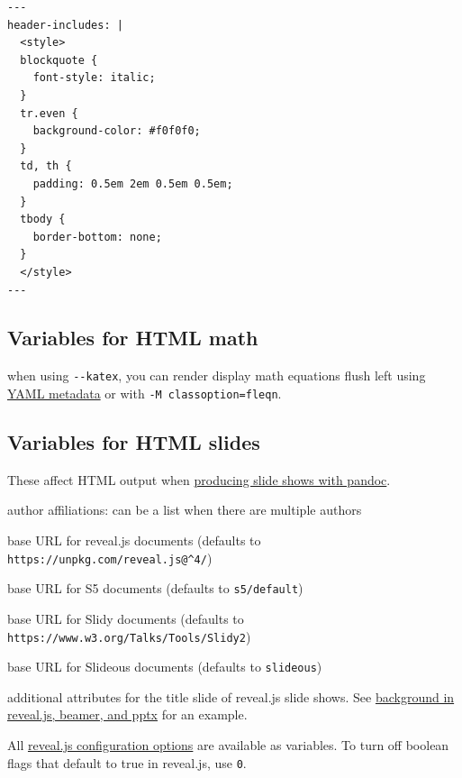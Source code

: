 \documentclass[
  b5paper
]{book}
\providecommand{\tightlist}{%
  \setlength{\itemsep}{0pt}\setlength{\parskip}{0pt}}
\begin{document}
\begin{verbatim}
---
header-includes: |
  <style>
  blockquote {
    font-style: italic;
  }
  tr.even {
    background-color: #f0f0f0;
  }
  td, th {
    padding: 0.5em 2em 0.5em 0.5em;
  }
  tbody {
    border-bottom: none;
  }
  </style>
---
\end{verbatim}

\subsection{Variables for HTML math}\label{variables-for-html-math}

\begin{description}
\tightlist
\item[\texttt{classoption}]
when using \texttt{-\/-katex}, you can render display math equations
flush left using \hyperref[layout]{YAML metadata} or with
\texttt{-M\ classoption=fleqn}.
\end{description}

\subsection{Variables for HTML slides}\label{variables-for-html-slides}

These affect HTML output when \hyperref[slide-shows]{producing slide
shows with pandoc}.

\begin{description}
\tightlist
\item[\texttt{institute}]
author affiliations: can be a list when there are multiple authors
\item[\texttt{revealjs-url}]
base URL for reveal.js documents (defaults to
\texttt{https://unpkg.com/reveal.js@\^{}4/})
\item[\texttt{s5-url}]
base URL for S5 documents (defaults to \texttt{s5/default})
\item[\texttt{slidy-url}]
base URL for Slidy documents (defaults to
\texttt{https://www.w3.org/Talks/Tools/Slidy2})
\item[\texttt{slideous-url}]
base URL for Slideous documents (defaults to \texttt{slideous})
\item[\texttt{title-slide-attributes}]
additional attributes for the title slide of reveal.js slide shows. See
\hyperref[background-in-reveal.js-beamer-and-pptx]{background in
reveal.js, beamer, and pptx} for an example.
\end{description}

All \href{https://revealjs.com/config/}{reveal.js configuration options}
are available as variables. To turn off boolean flags that default to
true in reveal.js, use \texttt{0}.
\end{document}
